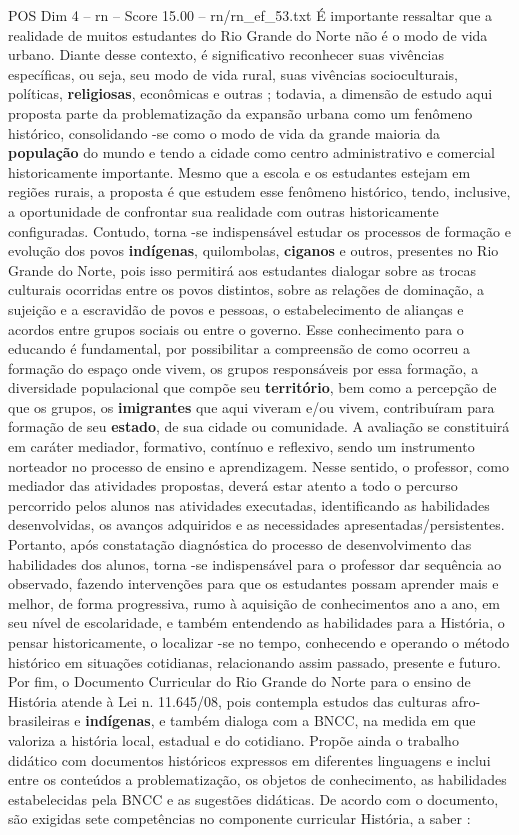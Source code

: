 \begin{textsample}{POS Dim 4 – rn – Score 15.00 – rn/rn\_ef\_53.txt}
É importante ressaltar que a realidade de muitos estudantes do Rio Grande do Norte não é o modo de vida urbano.
Diante desse contexto, é significativo reconhecer suas vivências específicas, ou seja, seu modo de vida rural, suas vivências socioculturais, políticas, \textbf{religiosas}, econômicas e outras ; todavia, a dimensão de estudo aqui proposta parte da problematização da expansão urbana como um fenômeno histórico, consolidando -se como o modo de vida da grande maioria da \textbf{população} do mundo e tendo a cidade como centro administrativo e comercial historicamente importante.
Mesmo que a escola e os estudantes estejam em regiões rurais, a proposta é que estudem esse fenômeno histórico, tendo, inclusive, a oportunidade de confrontar sua realidade com outras historicamente configuradas.
Contudo, torna -se indispensável estudar os processos de formação e evolução dos povos \textbf{indígenas}, quilombolas, \textbf{ciganos} e outros, presentes no Rio Grande do Norte, pois isso permitirá aos estudantes dialogar sobre as trocas culturais ocorridas entre os povos distintos, sobre as relações de dominação, a sujeição e a escravidão de povos e pessoas, o estabelecimento de alianças e acordos entre grupos sociais ou entre o governo.
Esse conhecimento para o educando é fundamental, por possibilitar a compreensão de como ocorreu a formação do espaço onde vivem, os grupos responsáveis por essa formação, a diversidade populacional que compõe seu \textbf{território}, bem como a percepção de que os grupos, os \textbf{imigrantes} que aqui viveram e/ou vivem, contribuíram para formação de seu \textbf{estado}, de sua cidade ou comunidade.
A avaliação se constituirá em caráter mediador, formativo, contínuo e reflexivo, sendo um instrumento norteador no processo de ensino e aprendizagem.
Nesse sentido, o professor, como mediador das atividades propostas, deverá estar atento a todo o percurso percorrido pelos alunos nas atividades executadas, identificando as habilidades desenvolvidas, os avanços adquiridos e as necessidades apresentadas/persistentes.
Portanto, após constatação diagnóstica do processo de desenvolvimento das habilidades dos alunos, torna -se indispensável para o professor dar sequência ao observado, fazendo intervenções para que os estudantes possam aprender mais e melhor, de forma progressiva, rumo à aquisição de conhecimentos ano a ano, em seu nível de escolaridade, e também entendendo as habilidades para a História, o pensar historicamente, o localizar -se no tempo, conhecendo e operando o método histórico em situações cotidianas, relacionando assim passado, presente e futuro.
Por fim, o Documento Curricular do Rio Grande do Norte para o ensino de História atende à Lei n. 11.645/08, pois contempla estudos das culturas afro-brasileiras e \textbf{indígenas}, e também dialoga com a BNCC, na medida em que valoriza a história local, estadual e do cotidiano.
Propõe ainda o trabalho didático com documentos históricos expressos em diferentes linguagens e inclui entre os conteúdos a problematização, os objetos de conhecimento, as habilidades estabelecidas pela BNCC e as sugestões didáticas.
De acordo com o documento, são exigidas sete competências no componente curricular História, a saber :


\end{textsample}
